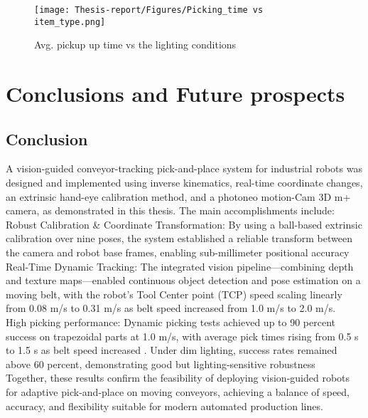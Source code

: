 \documentclass[12pt]{article}
\begin{document}
\begin{figure}[h]
    \centering
    \texttt{[image: Thesis-report/Figures/Picking\_time vs item\_type.png]}
    \caption{Avg. pickup up time vs the lighting conditions \cite{ref22}}
    \label{fig:Picking_time vs item_type.png}
\end{figure}

\newpage
\section{Conclusions and Future prospects}
\label{Conclusion}

\subsection{Conclusion}
    
A vision-guided conveyor-tracking pick-and-place system for industrial robots was designed and implemented using inverse kinematics, real-time coordinate changes, an extrinsic hand-eye calibration method, and a photoneo motion-Cam 3D m+ camera, as demonstrated in this thesis.  The main accomplishments include:\\

Robust Calibration \& Coordinate Transformation: By using a ball-based extrinsic calibration over nine poses, the system established a reliable transform between the camera and robot base frames, enabling sub-millimeter positional accuracy\\


Real-Time Dynamic Tracking: The integrated vision pipeline—combining depth and texture maps—enabled continuous object detection and pose estimation on a moving belt, with the robot’s Tool Center point (TCP) speed scaling linearly from 0.08 m/s to 0.31 m/s as belt speed increased from 1.0 m/s to 2.0 m/s.\\


High picking performance: Dynamic picking tests achieved up to 90 percent success on trapezoidal parts at 1.0 m/s, with average pick times rising from 0.5 s to 1.5 s as belt speed increased 
. Under dim lighting, success rates remained above 60 percent, demonstrating good but lighting-sensitive robustness\\

Together, these results confirm the feasibility of deploying vision‑guided robots for adaptive pick‑and‑place on moving conveyors, achieving a balance of speed, accuracy, and flexibility suitable for modern automated production lines.
\newpage
\end{document}
